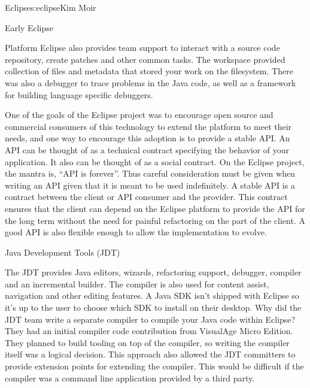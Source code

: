 \begin{aosachapter}{Eclipse}{s:eclipse}{Kim Moir}
\begin{aosasect1}{Early Eclipse}
\begin{aosasect2}{Platform}
Eclipse also provides team support to interact with a source code
repository, create patches and other common tasks.  The workspace
provided collection of files and metadata that stored your work on the
filesystem. There was also a debugger to trace problems in the
Java code, as well as a framework for building language specific
debuggers.

One of the goals of the Eclipse project was to encourage open source
and commercial consumers of this technology to extend the platform to
meet their needs, and one way to encourage this adoption is to provide a
stable API\@. An API can be thought of as a technical contract
specifying the behavior of your application. It also can be thought
of as a social contract. On the Eclipse project, the mantra is, ``API
is forever''. Thus careful consideration must be given when writing an
API given that it is meant to be used indefinitely. A stable API is
a contract between the client or API consumer and the provider. This
contract ensures that the client can depend on the Eclipse platform to
provide the API for the long term without the need for painful
refactoring on the part of the client.  A good API is also flexible
enough to allow the implementation to evolve.

\end{aosasect2}

\begin{aosasect2}{Java Development Tools (JDT)}

The JDT provides Java editors, wizards, refactoring support, debugger,
compiler and an incremental builder.  The compiler is also used for
content assist, navigation and other editing features. A Java SDK
isn't shipped with Eclipse so it's up to the user to choose which SDK to
install on their desktop. Why did the JDT team write a separate
compiler to compile your Java code within Eclipse?  They had an
initial compiler code contribution from VisualAge Micro Edition. They
planned to build tooling on top of the compiler, so writing the
compiler itself was a logical decision. This approach also allowed the
JDT committers to provide extension points for extending the
compiler. This would be difficult if the compiler was a command line
application provided by a third party.


\end{aosasect2}
\end{aosasect1}
\end{aosachapter}
